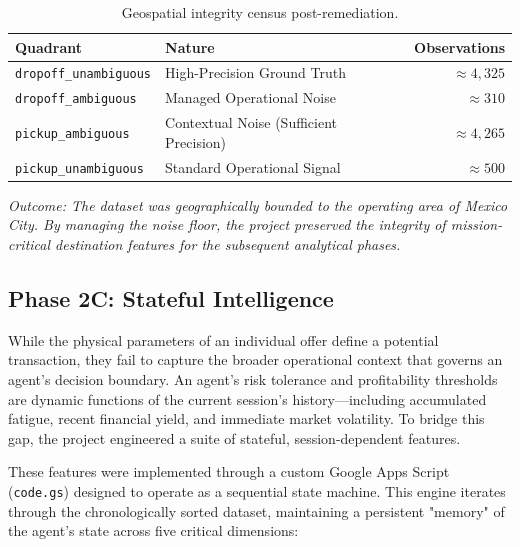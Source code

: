 \begin{table}[H]
    \centering
    \small
    \begin{tabularx}{\textwidth}{l l r}
        \toprule
        \textbf{Quadrant} & \textbf{Nature} & \textbf{Observations} \\
        \midrule
        \texttt{dropoff\_unambiguous} & High-Precision Ground Truth & $\approx 4,325$ \\
        \addlinespace
        \texttt{dropoff\_ambiguous} & Managed Operational Noise & $\approx 310$ \\
        \addlinespace
        \texttt{pickup\_ambiguous} & Contextual Noise (Sufficient Precision) & $\approx 4,265$ \\
        \addlinespace
        \texttt{pickup\_unambiguous} & Standard Operational Signal & $\approx 500$ \\
        \bottomrule
    \end{tabularx}
    \caption{Geospatial integrity census post-remediation.}
    \label{tab:geo_quadrants}
\end{table}

\noindent \textit{Outcome: The dataset was geographically bounded to the operating area of Mexico City. By managing the noise floor, the project preserved the integrity of mission-critical destination features for the subsequent analytical phases.}


\subsection{Phase 2C: Stateful Intelligence}

While the physical parameters of an individual offer define a potential transaction, they fail to capture the broader operational context that governs an agent’s decision boundary. An agent's risk tolerance and profitability thresholds are dynamic functions of the current session's history—including accumulated fatigue, recent financial yield, and immediate market volatility. To bridge this gap, the project engineered a suite of stateful, session-dependent features.

These features were implemented through a custom Google Apps Script (\texttt{code.gs}) designed to operate as a sequential state machine. This engine iterates through the chronologically sorted dataset, maintaining a persistent "memory" of the agent's state across five critical dimensions:


